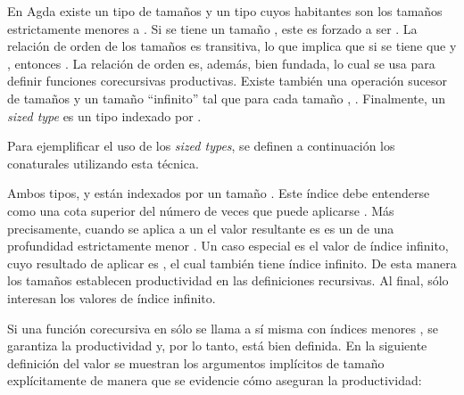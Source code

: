 En Agda existe un tipo  de tamaños y un tipo   cuyos habitantes son los tamaños estrictamente menores a . Si se tiene un tamaño  \AgdaSymbol{:}  , este es forzado a ser  \AgdaSymbol{:} . La relación de orden de los tamaños es transitiva, lo que implica que si se tiene que  \AgdaSymbol{:}   y  \AgdaSymbol{:}  , entonces  \AgdaSymbol{:}  . La relación de orden es, además, bien fundada, lo cual se usa para definir funciones corecursivas productivas. Existe también una operación sucesor de tamaños \AgdaFunction{$\uparrow$} y un tamaño ``infinito'' \AgdaArgument{$\infty$} tal que para cada tamaño ,  \AgdaSymbol{:}  \AgdaArgument{$\infty$}. Finalmente, un \textit{sized type} es un tipo indexado por .

Para ejemplificar el uso de los \textit{sized types}, se definen a continuación los conaturales utilizando esta técnica.


Ambos tipos,  y  están indexados por un tamaño . Este índice debe entenderse como una cota superior del número de veces que puede aplicarse . Más precisamente, cuando se aplica  a un  \AgdaSymbol{:}   el valor resultante es es un  \AgdaSymbol{:}   de una profundidad estrictamente menor  \AgdaSymbol{<} . Un caso especial es el valor  \AgdaSymbol{:}  \AgdaArgument{$\infty$} de índice infinito, cuyo resultado de aplicar  es  \AgdaSymbol{:}  \AgdaArgument{$\infty$}, el cual también tiene índice infinito. De esta manera los tamaños establecen productividad en las definiciones recursivas. Al final, sólo interesan los valores  \AgdaSymbol{:}  \AgdaArgument{$\infty$} de índice infinito.

Si una función corecursiva en   sólo se llama a sí misma con índices menores  \AgdaSymbol{<} , se garantiza la productividad y, por lo tanto, está bien definida. En la siguiente definición del valor  se muestran los argumentos implícitos de tamaño explícitamente de manera que se evidencie cómo aseguran la productividad:


